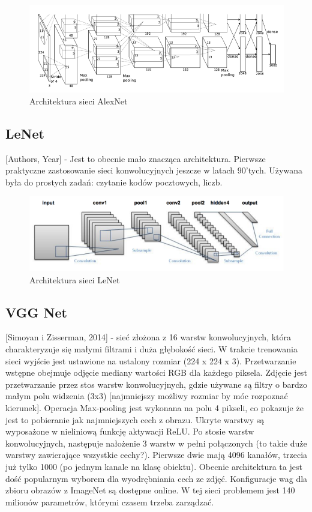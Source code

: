 \documentclass[12pt,a4paper,twoside,titlepage,openright]{book}
\begin{document}
{\begin{figure}[h]
	\centering
			\includegraphics[resolution=120]{AlexNet.png}
		\caption{Architektura sieci AlexNet}
\end{figure}

\subsection{LeNet}
[Authors, Year] - Jest to obecnie mało znacząca architektura. Pierwsze praktyczne zastosowanie sieci konwolucyjnych jeszcze w latach 90’tych. Używana była do prostych zadań: czytanie kodów pocztowych, liczb.\cite{Lecun98gradient-basedlearning}

\begin{figure}[h]
	\centering
			\includegraphics[resolution=120]{LeNet.png}
		\caption{Architektura sieci LeNet}
\end{figure}

\subsection{VGG Net}
 [Simoyan i Zisserman, 2014] - sieć złożona z 16 warstw konwolucyjnych, która charakteryzuje się małymi filtrami i duża głębokość sieci.
W trakcie trenowania sieci wyjście jest ustawione na ustalony rozmiar (224 x 224 x 3). Przetwarzanie wstępne obejmuje odjęcie mediany wartości RGB dla każdego piksela. Zdjęcie jest przetwarzanie przez stos warstw konwolucyjnych, gdzie używane są filtry o bardzo małym polu widzenia (3x3) [najmniejszy możliwy rozmiar by móc rozpoznać kierunek]. Operacja Max-pooling jest wykonana na polu 4 pikseli, co pokazuje że jest to pobieranie jak najmniejszych cech z obrazu. Ukryte warstwy są wyposażone w nieliniową funkcję aktywacji ReLU. Po stosie warstw konwolucyjnych, następuje nałożenie 3 warstw w pełni połączonych (to takie duże warstwy zawierające wszystkie cechy?). Pierwsze dwie mają 4096 kanałów, trzecia już tylko 1000 (po jednym kanale na klasę obiektu). Obecnie architektura ta jest dość popularnym wyborem dla wyodrębniania cech ze zdjęć. Konfiguracje wag dla zbioru obrazów z ImageNet są dostępne online. W tej sieci problemem jest 140 milionów parametrów, którymi czasem trzeba zarządzać. \cite{DBLP:journals/corr/SimonyanZ14a}

}
\end{document}
